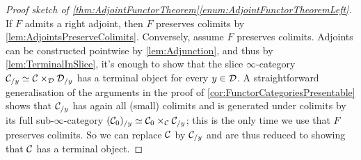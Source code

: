 \begin{proof}[Proof sketch of \cref{thm:AdjointFunctorTheorem}\cref{enum:AdjointFunctorTheoremLeft}]
	If $F$ admits a right adjoint, then $F$ preserves colimits by \cref{lem:AdjointsPreserveColimits}. Conversely, assume $F$ preserves colimits. Adjoints can be constructed pointwise by \cref{lem:Adjunction}, and thus by \cref{lem:TerminalInSlice}, it's enough to show that the slice $\infty$-category $\mathcal{C}_{/y}\simeq \mathcal{C}\times_{\mathcal{D}}\mathcal{D}_{/y}$ has a terminal object for every $y\in\mathcal{D}$. A straightforward generalisation of the arguments in the proof of \cref{cor:FunctorCategoriesPresentable} shows that $\mathcal{C}_{/y}$ has again all (small) colimits and is generated under colimits by its full sub-$\infty$-category $(\mathcal{C}_0)_{/y}\simeq \mathcal{C}_0\times_{\mathcal{C}}\mathcal{C}_{/y}$; this is the only time we use that $F$ preserves colimits. So we can replace $\mathcal{C}$ by $\mathcal{C}_{/y}$ and are thus reduced to showing that $\mathcal{C}$ has a terminal object.		
	
	

\end{proof}
